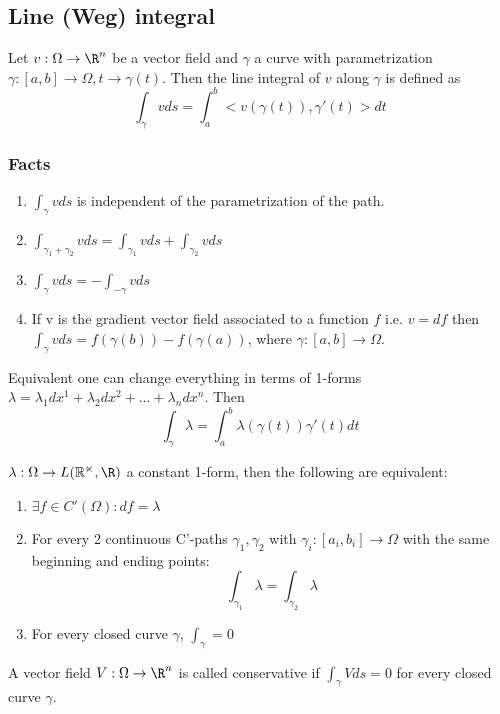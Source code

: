 \documentclass[a4paper]{article}
\begin{document}
\subsection{Line (Weg) integral}
Let $v:\Omega \rightarrow \R^n$ be a vector field and $\gamma$ a curve with parametrization $\gamma: [a,b]\rightarrow \Omega, t\rightarrow \gamma(t)$. Then the line integral of $v$ along $\gamma$ is defined as 
$$\int_{\gamma} v ds= \int_a^b <v(\gamma(t)),\gamma '(t)> dt$$

\subsubsection*{Facts}
\begin{enumerate}
\item $\int_{\gamma} vds$ is independent of the parametrization of the path.
\item $\int_{\gamma_1+\gamma_2} vds=\int_{\gamma_1} vds+ \int_{\gamma_2} vds$
\item $\int_{\gamma} vds= -\int_{-\gamma} vds$
\item If v  is the gradient vector field associated to a function $f$ i.e. $v=df$ then $\int_{\gamma} vds=f(\gamma(b))-f(\gamma(a))$, where $\gamma: [a,b] \rightarrow \Omega$.
\end{enumerate}
Equivalent one can change everything in terms of 1-forms $\lambda=\lambda_1 dx^1+\lambda_2 dx^2+ ... + \lambda_n dx^n$. Then $$\int_{\gamma} \lambda = \int_a^b \lambda(\gamma(t))\gamma '(t)dt$$

\begin{fact}{}
$\lambda: \Omega \rightarrow L(\mathbb{R^n}, \R)$ a constant 1-form, then the following are equivalent:
\begin{enumerate}
\item $\exists f \in C'(\Omega) : df=\lambda$
\item For every 2 continuous C'-paths $\gamma_1, \gamma_2$ with $\gamma_i:[a_i,b_i]\rightarrow \Omega$ with the same beginning and ending points:
$$\int_{\gamma_1} \lambda=\int_{\gamma_2} \lambda$$
\item For every closed curve $\gamma$, $\int_{\gamma}=0$
\end{enumerate}
\end{fact}
\begin{definition}{}
A vector field $V:\Omega \rightarrow \R^n$ is called conservative if $\int_{\gamma} Vds=0$ for every closed curve $\gamma$.
\end{definition}
\end{document}
